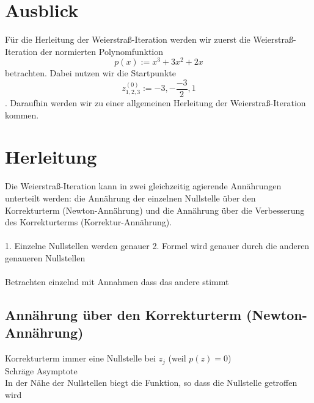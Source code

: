 \documentclass[12pt]{article}
\begin{document}
\section*{Ausblick}
Für die Herleitung der Weierstraß-Iteration werden wir zuerst die Weierstraß-Iteration der normierten Polynomfunktion
\begin{equation}
  p(x) := x^3+3x^2+2x
\end{equation}
betrachten. Dabei nutzen wir die Startpunkte
\begin{equation}
  z^{(0)}_{1,2,3} := -3, -\frac{-3}{2}, 1
\end{equation}
. Daraufhin werden wir zu einer allgemeinen Herleitung der Weierstraß-Iteration kommen.

\section*{Herleitung}
Die Weierstraß-Iteration kann in zwei gleichzeitig agierende Annährungen unterteilt werden: die Annährung der einzelnen Nullstelle über den Korrekturterm (Newton-Annährung) und die Annährung über die Verbesserung des Korrekturterms (Korrektur-Annährung).
\\\\
1. Einzelne Nullstellen werden genauer
2. Formel wird genauer durch die anderen genaueren Nullstellen
\\\\
Betrachten einzelnd mit Annahmen dass das andere stimmt

\subsection*{Annährung über den Korrekturterm (Newton-Annährung)}

Korrekturterm immer eine Nullstelle bei $z_j$ (weil $p(z)=0$)
\\
Schräge Asymptote
\\
In der Nähe der Nullstellen biegt die Funktion, so dass die Nullstelle getroffen wird
\\
\end{document}
